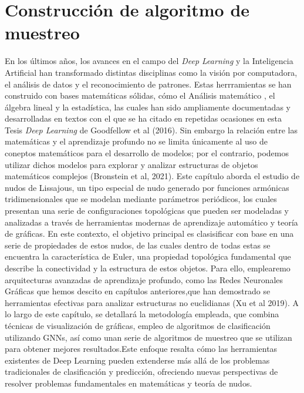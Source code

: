 \chapter{Construcción de algoritmo de muestreo}
En los últimos años, los avances en el campo del \textit{Deep Learning} y la Inteligencia Artificial han transformado distintas disciplinas como la visión por computadora, el análisis de datos y el reconocimiento de patrones. Estas herrramientas se han construido con bases matemáticas sólidas, cómo el Análisis matemático , el álgebra lineal y la estadística, las cuales han sido ampliamente documentadas y desarrolladas en textos con el que se ha citado en repetidas ocasiones en esta Tesis \textit{Deep Learning} de Goodfellow et al (2016). Sin embargo la relación entre las matemáticas y el aprendizaje profundo no se limita únicamente al uso de coneptos matemáticos para el desarrollo de modelos; por el contrario, podemos utilizar dichos modelos para explorar y analizar estructuras de objetos matemáticos complejos (Bronstein et al, 2021).
Este capítulo aborda el estudio de nudos de Lissajous, un tipo especial de nudo generado por funciones armónicas tridimensionales que se modelan mediante parámetros periódicos, los cuales presentan una serie de configuraciones topológicas que pueden ser modeladas y analizadas a través de herramientas modernas de aprendizaje automático y teoría de gráficas. En este contexto, el objetivo principal es clasisificar con base en una serie de propiedades de estos nudos, de las cuales dentro de todas estas se encuentra la característica de Euler, una propiedad topológica fundamental que describe la conectividad y la estructura de estos objetos. Para ello, emplearemo arquitecturas avanzadas de aprendizaje profundo, como las Redes Neuronales Gráficas que hemos descito en capítulos anteriores,que han demostrado se herramientas efectivas para analizar estructuras no euclidianas (Xu et al 2019).
A lo largo de este capítulo, se detallará la metodología empleada, que combina técnicas de visualización de gráficas, empleo de algoritmos de clasificación utilizando GNNs, así como unan serie de algoritmos de muestreo que se utilizan para obtener mejores resultados.Este enfoque resalta cómo las herramientas existentes de Deep Learning pueden extenderse más allá de los problemas tradicionales de clasificación y predicción, ofreciendo nuevas perspectivas de resolver problemas fundamentales en matemáticas y teoría de nudos.


